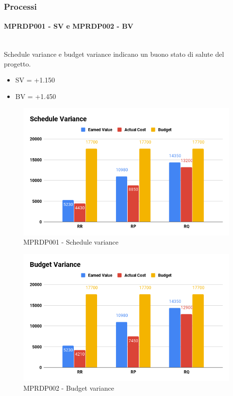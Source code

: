 \subsubsection{Processi}
\paragraph{MPRDP001 - SV e MPRDP002 -  BV}\mbox{}\\[0.4cm]
Schedule variance e budget variance indicano un buono stato di salute del progetto.
\begin{itemize}
	\item SV = +1.150
	\item BV = +1.450
\end{itemize}
\begin{figure}[H]
	\centering
	\includegraphics[width=13cm,keepaspectratio]{../includes/pics/Schedule_Variance.png}
	\caption{\label{fig:mission}MPRDP001 - Schedule variance}
\end{figure}
\begin{figure}[H]
	\centering
	\includegraphics[width=13cm,keepaspectratio]{../includes/pics/Budget_Variance.png}
	\caption{\label{fig:mission}MPRDP002 - Budget variance}
\end{figure}
